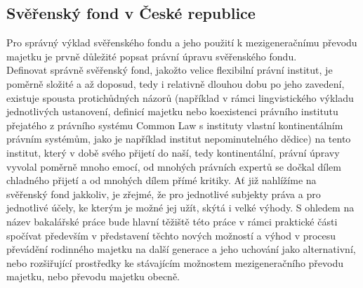 \documentclass{article}
\begin{document}


\subsection{Svěřenský fond v České republice}




Pro správný výklad svěřenského fondu a jeho použití k mezigeneračnímu převodu majetku je prvně důležité popsat právní úpravu svěřenského fondu.\\

Definovat správně svěřenský fond, jakožto velice flexibilní právní institut, je poměrně složité a až doposud, tedy i relativně dlouhou dobu po jeho zavedení, existuje spousta protichůdných názorů (například v rámci lingvistického výkladu jednotlivých ustanovení, definicí majetku nebo koexistenci právního institutu přejatého z právního systému Common Law s instituty vlastní kontinentálním právním systémům, jako je například institut nepominutelného dědice) na tento institut, který v době svého přijetí do naší, tedy kontinentální, právní úpravy vyvolal poměrně mnoho emocí, od mnohých právních expertů se dočkal dílem chladného přijetí a od mnohých dílem přímé kritiky. Ať již nahlížíme na svěřenský fond jakkoliv, je zřejmé, že pro jednotlivé subjekty práva a pro jednotlivé účely, ke kterým je možné jej užít, skýtá i velké výhody. S ohledem na název bakalářské práce bude hlavní těžiště této práce v rámci praktické části spočívat především v představení těchto nových možností a výhod v procesu převádění rodinného majetku na další generace a jeho uchování jako alternativní, nebo rozšiřující prostředky ke stávajícím možnostem mezigeneračního převodu majetku, nebo převodu majetku obecně. \\
\end{document}
